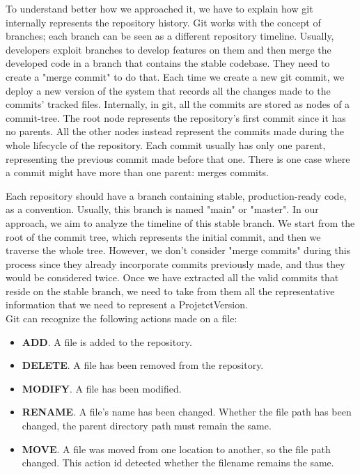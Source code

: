 To understand better how we approached it, we have to explain how git internally represents the repository history. 
Git works with the concept of branches; each branch can be seen as a different repository timeline.
Usually, developers exploit branches to develop features on them and then merge the developed code in a branch that contains the stable codebase.
They need to create a "merge commit" to do that. 
Each time we create a new git commit, we deploy a new version of the system that records all the changes made to the commits' tracked files. 
Internally, in git, all the commits are stored as nodes of a commit-tree. 
The root node represents the repository's first commit since it has no parents. 
All the other nodes instead represent the commits made during the whole lifecycle of the repository. 
Each commit usually has only one parent, representing the previous commit made before that one.
There is one case where a commit might have more than one parent: merges commits.

Each repository should have a branch containing stable, production-ready code, as a convention. Usually, this branch is named "main" or "master". 
In our approach, we aim to analyze the timeline of this stable branch. We start from the root of the commit tree, which represents the initial commit, and then we traverse the whole tree. 
However, we don't consider "merge commits" during this process since they already incorporate commits previously made, and thus they would be considered twice. 
Once we have extracted all the valid commits that reside on the stable branch, we need to take from them all the representative information that we need to represent a ProjetctVersion. \\

Git can recognize the following actions made on a file:
\begin{itemize}
    \item \textbf{ADD}. A file is added to the repository.
    \item \textbf{DELETE}. A file has been removed from the repository.
    \item \textbf{MODIFY}. A file has been modified.
    \item \textbf{RENAME}. A file's name has been changed. Whether the file path has been changed, the parent directory path must remain the same. 
    \item \textbf{MOVE}. A file was moved from one location to another, so the file path changed. This action id detected whether the filename remains the same. 
\end{itemize}

